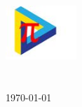 \documentclass[
11pt, %
english, %
singlespacing, %
oneside,
headsepline, %
]{MastersDoctoralThesis} %
\begin{document}
\begin{titlepage}
\begin{center}
\includegraphics[width=0.2\textwidth]{images/faclogo.jpg}\\[0.5cm]
\facname\\\deptname\\[2cm]
\vfill
{\large \today}\\[4cm]

\vfill
\end{center}
\end{titlepage}


\tableofcontents %
\listoffigures %

\end{document}
